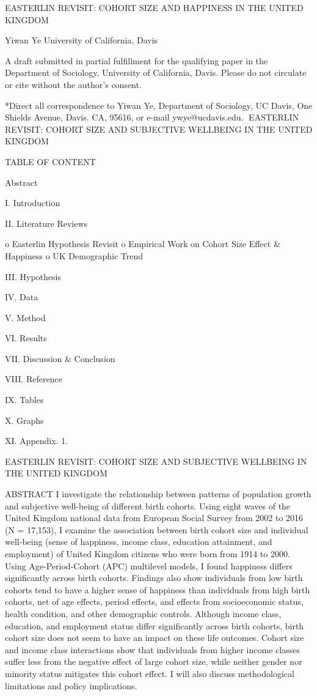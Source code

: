 EASTERLIN REVISIT:
COHORT SIZE AND HAPPINESS IN THE UNITED KINGDOM

Yiwan Ye
University of California, Davis


A draft submitted in partial fulfillment for the qualifying paper in the Department of Sociology, University of California, Davis.
Please do not circulate or cite without the author’s consent.






*Direct all correspondence to Yiwan Ye, Department of Sociology, UC Davis, One Shields Avenue, Davis. CA, 95616, or e-mail ywye@ucdavis.edu.

EASTERLIN REVISIT:
COHORT SIZE AND SUBJECTIVE WELLBEING IN THE UNITED KINGDOM

TABLE OF CONTENT

Abstract

I. Introduction

II. Literature Reviews

o	Easterlin Hypothesis Revisit
o	Empirical Work on Cohort Size Effect & Happiness
o	UK Demographic Trend

III. Hypothesis

IV. Data

V. Method

VI. Results

VII. Discussion & Conclusion

VIII. Reference

IX. Tables

X. Graphs

XI. Appendix.
1.

EASTERLIN REVISIT:
COHORT SIZE AND SUBJECTIVE WELLBEING IN THE UNITED KINGDOM

ABSTRACT
I investigate the relationship between patterns of population growth and subjective well-being of different birth cohorts. Using eight waves of the United Kingdom national data from European Social Survey from 2002 to 2016 (N = 17,153), I examine the association between birth cohort size and individual well-being (sense of happiness, income class, education attainment, and employment) of United Kingdom citizens who were born from 1914 to 2000. Using Age-Period-Cohort (APC) multilevel models, I found happiness differs significantly across birth cohorts. Findings also show individuals from low birth cohorts tend to have a higher sense of happiness than individuals from high birth cohorts, net of age effects, period effects, and effects from socioeconomic status, health condition, and other demographic controls. Although income class, education, and employment status differ significantly across birth cohorts, birth cohort size does not seem to have an impact on these life outcomes. Cohort size and income class interactions show that individuals from higher income classes suffer less from the negative effect of large cohort size, while neither gender nor minority status mitigates this cohort effect. I will also discuss methodological limitations and policy implications.

